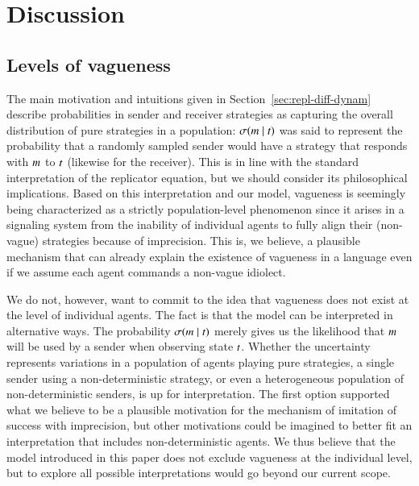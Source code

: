 \documentclass[fleqn,reqno,10pt]{article}
\begin{document}

\section{Discussion}
\label{sec:discussion}

\subsection{Levels of vagueness}
The main motivation and intuitions given in Section~\ref{sec:repl-diff-dynam} describe probabilities in sender and receiver strategies as capturing the overall distribution of pure strategies in a population: $\sigma(m \mid t)$ was said to represent the probability that a randomly sampled sender would have a strategy that responds with $m$ to $t$ (likewise for the receiver).
This is in line with the standard interpretation of the replicator equation, but we should consider its philosophical implications.
Based on this interpretation and our model, vagueness is seemingly being characterized as a strictly population-level phenomenon since it arises in a signaling system from the inability of individual agents to fully align their (non-vague) strategies because of imprecision.
This is, we believe, a plausible mechanism that can already explain the existence of vagueness in a language even if we assume each agent commands a non-vague idiolect.

We do not, however, want to commit to the idea that vagueness does not exist at the level of individual agents.
The fact is that the model can be interpreted in alternative ways.
The probability $\sigma(m \mid t)$ merely gives us the likelihood that $m$ will be used by a sender when observing state $t$.
Whether the uncertainty represents variations in a population of agents playing pure strategies, a single sender using a non-deterministic strategy, or even a heterogeneous population of non-deterministic senders, is up for interpretation.
The first option supported what we believe to be a plausible motivation for the mechanism of imitation of success with imprecision, but other motivations could be imagined to better fit an interpretation that includes non-deterministic agents.
We thus believe that the model introduced in this paper does not exclude vagueness at the individual level, but to explore all possible interpretations would go beyond our current scope.
\end{document}
